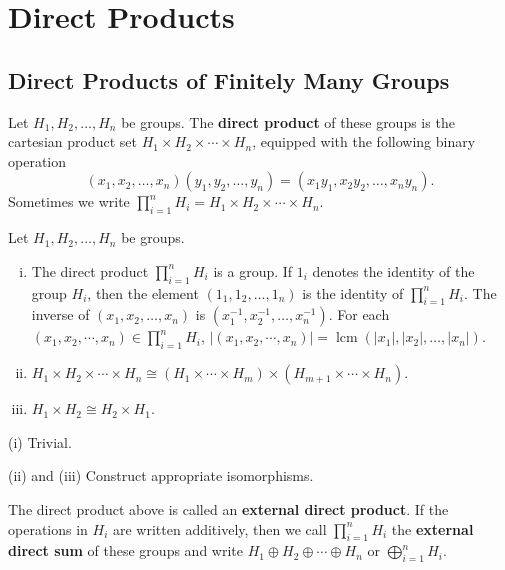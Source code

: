 \section{Direct Products}
\subsection{Direct Products of Finitely Many Groups}
\begin{definition}
	Let $H_1, H_2, \ldots, H_n$ be groups. The \textbf{direct product} of these groups is the cartesian product set $H_1 \times H_2 \times \cdots \times H_n$, equipped with the following binary operation
	\begin{equation*}
		(x_1, x_2, \ldots, x_n)(y_1, y_2, \ldots, y_n) = (x_1 y_1, x_2 y_2, \ldots, x_n y_n).
	\end{equation*}
	Sometimes we write $\prod_{i=1}^n H_i = H_1 \times H_2 \times \cdots \times H_n$.
\end{definition}
\begin{proposition}Let $H_1, H_2, \ldots, H_n$ be groups.
	\begin{enumerate}[(i)]
		\item The direct product $\prod_{i=1}^n H_i$ is a group. If $1_i$ denotes the identity of the group $H_i$, then the element $(1_1, 1_2, \ldots, 1_n)$ is the identity of $\prod_{i=1}^n H_i$. The inverse of $(x_1, x_2, \ldots, x_n)$ is $(x_1^{-1}, x_2^{-1}, \ldots, x_n^{-1})$. For each $(x_1,x_2,\cdots, x_n) \in\prod_{i=1}^n H_i$, $|(x_1,x_2,\cdots, x_n)| = \operatorname{lcm}(|x_1|,|x_2|,\dots, |x_n|)$.
		\item $H_1 \times H_2 \times \cdots \times H_n \cong (H_1 \times \cdots \times H_m) \times (H_{m+1} \times \cdots \times H_n)$.
		\item $H_1\times H_2 \cong H_2 \times H_1$.
	\end{enumerate}
\end{proposition}
\begin{sketch}
	(i) Trivial.
	
	(ii) and (iii) Construct appropriate isomorphisms.
\end{sketch}
\begin{definition}
	The direct product above is called an \textbf{external direct product}. If the operations in $H_i$ are written additively, then we call $\prod_{i=1}^n H_i$ the \textbf{external direct sum} of these groups and write $H_1\oplus H_2 \oplus \cdots \oplus H_n$ or $\bigoplus_{i=1}^n H_i$.
\end{definition}
